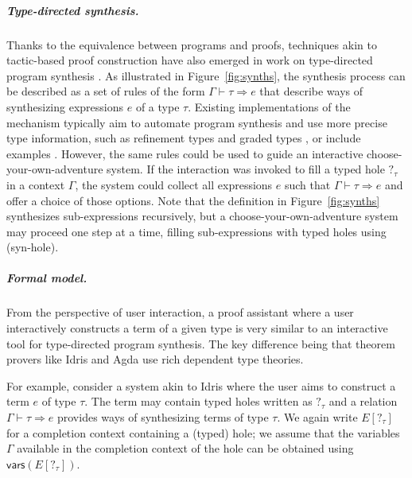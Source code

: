 \documentclass[ a4paper,UKenglish,cleveref, autoref, thm-restate]{lipics-v2021}
\newcommand{\ident}[1]{\textsf{#1}}
\begin{document}
\subparagraph{Type-directed synthesis.}
Thanks to the equivalence between programs and proofs, techniques akin to tactic-based proof
construction have also emerged in work on type-directed program synthesis \cite{knoth-2023-synthesis}.
As illustrated in Figure~\ref{fig:synths}, the synthesis process can be described as a set of
rules of the form $\Gamma \vdash \tau \Rightarrow e$ that describe ways of synthesizing
expressions $e$ of a type $\tau$. Existing implementations of the mechanism typically aim to
automate program synthesis and use more precise type information, such as refinement types
\cite{polikarpova-2016-synthesis} and graded types \cite{hughes-2024-synthesis}, or include
examples \cite{osera-2015-synthesis}. However, the same rules could be used to guide an
interactive choose-your-own-adventure system. If the interaction was invoked to fill a typed
hole $?_\tau$ in a context $\Gamma$, the system could collect all expressions $e$ such that
$\Gamma \vdash \tau \Rightarrow e$ and offer a choice of those options. Note that the definition
in Figure~\ref{fig:synths} synthesizes sub-expressions recursively, but a choose-your-own-adventure
system may proceed one step at a time, filling sub-expressions with typed holes using (\ident{syn-hole}).

\subparagraph{Formal model.}
From the perspective of user interaction, a proof assistant where a user interactively constructs
a term of a given type is very similar to an interactive tool for type-directed program synthesis.
The key difference being that theorem provers like Idris and Agda use rich dependent type theories.

For example, consider a system akin to Idris where the user aims to construct a term $e$ of type
$\tau$. The term may contain typed holes written as $?_\tau$ and a relation $\Gamma\vdash \tau\Rightarrow e$
provides ways of synthesizing terms of type $\tau$. We again write $E[?_\tau]$ for a
completion context containing a (typed) hole; we assume that the variables $\Gamma$ available in
the completion context of the hole can be obtained using $\ident{vars}(E[?_\tau])$.
\end{document}
